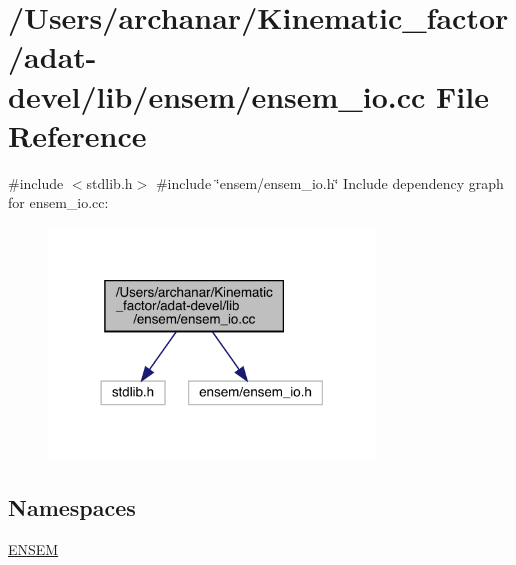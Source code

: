 \hypertarget{adat-devel_2lib_2ensem_2ensem__io_8cc}{}\section{/\+Users/archanar/\+Kinematic\+\_\+factor/adat-\/devel/lib/ensem/ensem\+\_\+io.cc File Reference}
\label{adat-devel_2lib_2ensem_2ensem__io_8cc}
{\ttfamily \#include $<$stdlib.\+h$>$}\newline
{\ttfamily \#include \char`\"{}ensem/ensem\+\_\+io.\+h\char`\"{}}\newline
Include dependency graph for ensem\+\_\+io.\+cc\+:
\nopagebreak
\begin{figure}[H]
\begin{center}
\leavevmode
\includegraphics[width=246pt]{d9/d6e/adat-devel_2lib_2ensem_2ensem__io_8cc__incl}
\end{center}
\end{figure}
\subsection*{Namespaces}
\begin{DoxyCompactItemize}
\item 
 \mbox{\hyperlink{namespaceENSEM}{E\+N\+S\+EM}}
\end{DoxyCompactItemize}
